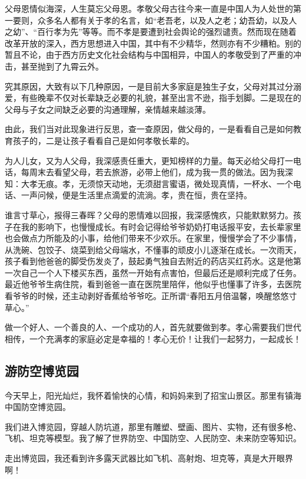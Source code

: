 \documentclass[UTF8,a4paper,titlepage,twoside,10.5pt]{article}
\begin{document}
父母恩情似海深，人生莫忘父母恩。孝敬父母古往今来一直是中国人为人处世的第一要则，众多名人都有关于孝的名言，如“老吾老，以及人之老；幼吾幼，以及人之幼”、“百行孝为先”等等。而不孝是要遭到社会舆论的强烈谴责。然而现在随着改革开放的深入，西方思想进入中国，其中有不少精华，然则亦有不少糟粕。别的暂且不论，由于西方历史文化社会结构与中国相异，中国人的孝敬受到了严重的冲击，甚至抛到了九霄云外。

究其原因，大致有以下几种原因，一是目前大多家庭是独生子女，父母对其过分溺爱，有些晚辈不仅对长辈缺乏必要的礼貌，甚至出言不逊，指手划脚。二是现在的父母与子女之间缺乏必要的沟通理解，亲情越来越淡薄。

由此，我们当对此现象进行反思，查一查原因，做父母的，一是看看自己是如何教育孩子的，二是让孩子看看自己是如何孝敬长辈的。

为人儿女，又为人父母，我深感责任重大，更知榜样的力量。每天必给父母打一电话，每周末去看望父母，若去旅游，必带上他们，成为我一贯的做法。因为我深知：大孝无痕。孝，无须惊天动地，无须甜言蜜语，微处现真情，一杯水、一个电话、一声问候，便是生活里点滴爱的流淌。孝，贵在恒，贵在坚持。

谁言寸草心，报得三春晖？父母的恩情难以回报，我深感愧疚，只能默默努力。孩子在我的影响下，也慢慢成长。有时会记得给爷爷奶奶打电话报平安，去长辈家里也会做点力所能及的小事，给他们带来不少欢乐。在家里，慢慢学会了不少事情，从洗碗、包饺子、烧菜到给父母端水，不懂事的顽皮小儿逐渐在成长。一次雨天，孩子看到他爸爸的脚受伤发炎了，鼓起勇气独自去附近的药店买红药水。这是他第一次自己一个人下楼买东西，虽然一开始有点害怕，但最后还是顺利完成了任务。最近他爷爷生病住院，看到爸爸一直在医院里陪伴，他似乎也懂事了许多，去医院看爷爷的时候，还主动剥好香蕉给爷爷吃。正所谓“春阳五月倍温馨，唤醒悠悠寸草心。”

做一个好人、一个善良的人、一个成功的人，首先就要做到孝。孝心需要我们世代相传，一个充满孝的家庭必定是幸福的！孝心无价！让我们一起努力，一起成长！

\subsection{游防空博览园}
\label{sec:org34f2135}

今天早上，阳光灿烂，我怀着愉快的心情，和妈妈来到了招宝山景区。那里有镇海中国防空博览园。

我们进入博览园，穿越人防坑道，那里有雕塑、壁画、图片、实物，还有很多枪、飞机、坦克等模型。我了解了世界防空、中国防空、人民防空、未来防空等知识。

走出博览园，我还看到许多露天武器比如飞机、高射炮、坦克等，真是大开眼界啊！
\end{document}
